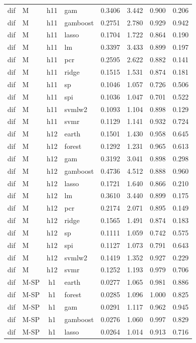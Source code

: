 \begin{ThreePartTable}
\begin{longtable}[t]{llclcccc}
dif & M & h11 & gam & 0.3406 & 3.442 & 0.900 & 0.206\\
dif & M & h11 & gamboost & 0.2751 & 2.780 & 0.929 & 0.942\\
dif & M & h11 & lasso & 0.1704 & 1.722 & 0.864 & 0.190\\
dif & M & h11 & lm & 0.3397 & 3.433 & 0.899 & 0.197\\
dif & M & h11 & pcr & 0.2595 & 2.622 & 0.882 & 0.141\\
dif & M & h11 & ridge & 0.1515 & 1.531 & 0.874 & 0.181\\
dif & M & h11 & sp & 0.1046 & 1.057 & 0.726 & 0.506\\
dif & M & h11 & spi & 0.1036 & 1.047 & 0.701 & 0.522\\
dif & M & h11 & svmlw2 & 0.1093 & 1.104 & 0.898 & 0.129\\
dif & M & h11 & svmr & 0.1129 & 1.141 & 0.932 & 0.724\\
\addlinespace
dif & M & h12 & earth & 0.1501 & 1.430 & 0.958 & 0.645\\
dif & M & h12 & forest & 0.1292 & 1.231 & 0.965 & 0.613\\
dif & M & h12 & gam & 0.3192 & 3.041 & 0.898 & 0.298\\
dif & M & h12 & gamboost & 0.4736 & 4.512 & 0.888 & 0.960\\
dif & M & h12 & lasso & 0.1721 & 1.640 & 0.866 & 0.210\\
dif & M & h12 & lm & 0.3610 & 3.440 & 0.899 & 0.175\\
dif & M & h12 & pcr & 0.2174 & 2.071 & 0.895 & 0.149\\
dif & M & h12 & ridge & 0.1565 & 1.491 & 0.874 & 0.183\\
dif & M & h12 & sp & 0.1111 & 1.059 & 0.742 & 0.575\\
dif & M & h12 & spi & 0.1127 & 1.073 & 0.791 & 0.643\\
dif & M & h12 & svmlw2 & 0.1419 & 1.352 & 0.927 & 0.229\\
dif & M & h12 & svmr & 0.1252 & 1.193 & 0.979 & 0.706\\
\addlinespace
dif & M-SP & h1 & earth & 0.0277 & 1.065 & 0.981 & 0.886\\
dif & M-SP & h1 & forest & 0.0285 & 1.096 & 1.000 & 0.825\\
dif & M-SP & h1 & gam & 0.0291 & 1.117 & 0.962 & 0.945\\
dif & M-SP & h1 & gamboost & 0.0276 & 1.060 & 0.997 & 0.829\\
dif & M-SP & h1 & lasso & 0.0264 & 1.014 & 0.913 & 0.716\\

\end{longtable}
\end{ThreePartTable}
